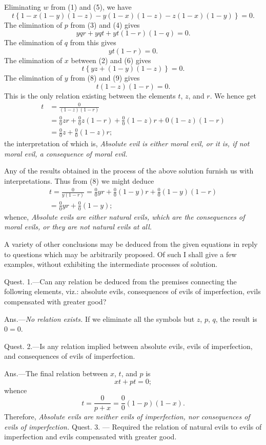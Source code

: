 \documentclass[oneside]{book}
\begin{document}
Eliminating $w$ from (1) and (5), we have
\[
t\left\{
   1 - x(1-y)(1-z) - y(1-x)(1-z) - z(1-x)(1-y)
 \right\} = 0.\tag{6}
\]
The elimination of $p$ from (3) and (4) gives
\[
 yqr + yqt + yt(1-r)(1-q) = 0. \tag{7}
\]
The elimination of $q$ from this gives
\[
 yt(1-r) = 0. \tag{8}
\]
The elimination of $x$ between (2) and (6) gives
\[
 t\left\{ yz + (1-y)(1-z) \right\} = 0. \tag{9}
\]
The elimination of $y$ from (8) and (9) gives
\[
 t(1-z)(1-r) = 0.
\]
This is the only relation existing between the elements $t$, $z$, and $r$.
We hence get
\begin{align*}
  t &= \frac{0}{(1-z)(1-r)}   \\
    &= \frac{0}{0}zr + \frac{0}{0}z(1-r)
     + \frac{0}{0}(1-z)r + 0(1-z)(1-r)   \\
    &= \frac{0}{0}z + \frac{0}{0}(1-z)r;
\end{align*}
the interpretation of which is, \emph{Absolute evil is either moral evil, or
it is, if not moral evil, a consequence of moral evil.}

Any of the results obtained in the process of the above solution furnish us with interpretations. Thus from (8) we might
deduce
\begin{multline*}
  t = \frac{0}{y(1-r)} = \frac{0}{0}yr
    + \frac{0}{0}(1-y)r + \frac{0}{0}(1-y)(1-r)   \\
  = \frac{0}{0}yr + \frac{0}{0}(1-y);
\end{multline*}
whence, \emph{Absolute evils are either natural evils, which are the consequences of moral evils, or they are not natural evils at all.}

A variety of other conclusions may be deduced from the given
equations in reply to questions which may be arbitrarily proposed. Of such I shall give a few examples, without exhibiting
the intermediate processes of solution.

Quest. 1.---Can any relation be deduced from the premises
connecting the following elements, viz.: absolute evils, consequences of evils of imperfection, evils compensated with greater
good?

Ans.---\emph{No relation exists.} If we eliminate all the symbols but
$z$, $p$, $q$, the result is $0 = 0$.

Quest. 2.---Is any relation implied between absolute evils,
evils of imperfection, and consequences of evils of imperfection.

Ans.---The final relation between $x$, $t$, and $p$ is
\[
  xt + pt = 0;
\]
whence
\[
  t = \frac{0}{p + x} = \frac{0}{0}(1-p)(1-x).
\]
Therefore, \emph{Absolute evils are neither evils of imperfection, nor consequences of evils of imperfection.}
Quest. 3. --- Required the relation of natural evils to evils of
imperfection and evils compensated with greater good.
\end{document}
